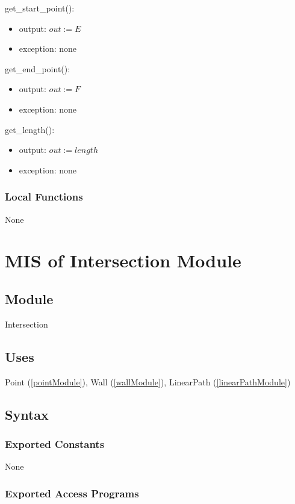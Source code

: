 \documentclass[12pt, titlepage]{article}
\begin{document}
\noindent get\_start\_point():
\begin{itemize}
\item output: $out :=  E$
\item exception: none
\end{itemize}

\noindent get\_end\_point():
\begin{itemize}
\item output: $out :=  F$
\item exception: none
\end{itemize}

\noindent get\_length():
\begin{itemize}
\item output: $out :=  length$\
\item exception: none
\end{itemize}

\subsubsection{Local Functions} None



\newpage
\section{MIS of Intersection Module} \label{intersectionModule}

\subsection{Module}

Intersection

\subsection{Uses}

Point (\autoref{pointModule}), Wall (\autoref{wallModule}), LinearPath (\autoref{linearPathModule}) 

\subsection{Syntax}

\subsubsection{Exported Constants} None

\subsubsection{Exported Access Programs}
\end{document}
